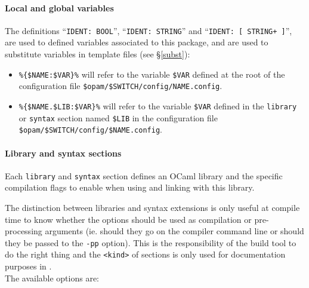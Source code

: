 \documentclass[a4paper,10pt]{article}
\begin{document}
\paragraph{Local and global variables}

The definitions ``{\tt IDENT: BOOL}'', ``{\tt IDENT: STRING}'' and ``{\tt IDENT:
  [ STRING+ ]}'', are used to defined variables associated to this
package, and are used to substitute variables in template files (see
\S\ref{subst}):

\begin{itemize}

\item \verb+%{$NAME:$VAR}%+ will refer to the variable \verb+$VAR+
  defined at the root of the configuration file \verb+$opam/$SWITCH/config/NAME.config+.

\item \verb+%{$NAME.$LIB:$VAR}%+ will refer to the variable \verb+$VAR+
  defined in the {\tt library} or {\tt syntax} section named
  \verb+$LIB+ in the configuration file \verb+$opam/$SWITCH/config/$NAME.config+.

\end{itemize}

\paragraph{Library and syntax sections}

Each {\tt library} and {\tt syntax} section defines an OCaml library
and the specific compilation flags to enable when using and linking
with this library.

The distinction between libraries and syntax extensions is only useful
at compile time to know whether the options should be used as
compilation or pre-processing arguments (ie. should they go on the
compiler command line or should they be passed to the {\tt -pp}
option). This is the responsibility of the build tool to do the right
thing and the {\tt <kind>} of sections is only used for documentation
purposes in \OPAM. \\

The available options are:
\end{document}
